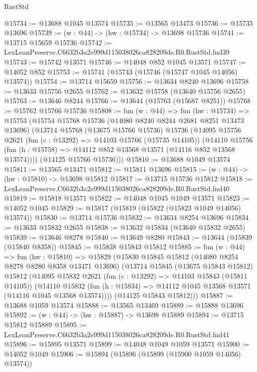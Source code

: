 \begin{lexlean}{RustStd}
\begin{coremodule}
@15734 := @13688 @1045 @13574
@15735 := @13565 @13473
@15736 := @15735 @13696
@15739 := (w : @44) -> (hw : @15734) -> @13698 @15736
@15741 := @13715 @15659 @15736
@15742 := LexLeanPreserve.C6632b3a2e999d115038026ca828209de.R0.RustStd.fnd39
@15743 := @15742 @13571
@15746 := @14048 @852 @1045 @13571
@15747 := @14052 @852
@15753 := @15741 (@15743 (@15746 (@15747 @1045 @14056) @13574))
@15754 := @13714 @15659
@15756 := @13634 @8240 @13696
@15758 := @13633 @15756 @2655
@15762 := @13632 @15758 (@13640 @15756 @2655)
@15763 := @13646 @8244
@15766 := @13644 (@15763 (@15687 @8251))
@15768 := @15762 @15766 @15736
@15808 := fun (w : @44) =>
  fun (hw : @15734) =>
  @15753
    (@15754
      @15768
      @15736
      (@14080 @8240 @8244 @2681 @8251 @13473 @13696)
      (@13714
        @15768
        (@13675 @15766 @15736)
        @15736
        (@14095
          @15756
          @2621
          (fun (c : @13292) => @14103 @15766 (@15735 @14105))
          (@14110
            @15756
            (fun (h : @15758) => @14112 @852 @13568 @13571 (@14116 @852 @13568 @13574))))
        (@14125 @15766 @15736)))
@15810 := @13688 @1049 @13574
@15811 := @13565 @13471
@15812 := @15811 @13696
@15815 := (w : @44) -> (hw : @15810) -> @13698 @15812
@15817 := @13715 @15736 @15812
@15818 := LexLeanPreserve.C6632b3a2e999d115038026ca828209de.R0.RustStd.fnd40
@15819 := @15818 @13571
@15822 := @14048 @1045 @1049 @13571
@15823 := @14052 @1045
@15829 := @15817 (@15819 (@15822 (@15823 @1049 @14056) @13574))
@15830 := @13714 @15736
@15832 := @13634 @8254 @13696
@15834 := @13633 @15832 @2655
@15838 := @13632 @15834 (@13640 @15832 @2655)
@15839 := @13646 @8278
@15840 := @13649 @8280
@15843 := @13644 (@15839 (@15840 @8358))
@15845 := @15838 @15843 @15812
@15885 := fun (w : @44) =>
  fun (hw : @15810) =>
  @15829
    (@15830
      @15845
      @15812
      (@14080 @8254 @8278 @8280 @8358 @13471 @13696)
      (@13714
        @15845
        (@13675 @15843 @15812)
        @15812
        (@14095
          @15832
          @2621
          (fun (c : @13292) => @14103 @15843 (@15811 @14105))
          (@14110
            @15832
            (fun (h : @15834) => @14112 @1045 @13568 @13571 (@14116 @1045 @13568 @13574))))
        (@14125 @15843 @15812)))
@15887 := @13688 @1059 @13574
@15888 := @13565 @13469
@15889 := @15888 @13696
@15892 := (w : @44) -> (hw : @15887) -> @13698 @15889
@15894 := @13715 @15812 @15889
@15895 := LexLeanPreserve.C6632b3a2e999d115038026ca828209de.R0.RustStd.fnd41
@15896 := @15895 @13571
@15899 := @14048 @1049 @1059 @13571
@15900 := @14052 @1049
@15906 := @15894 (@15896 (@15899 (@15900 @1059 @14056) @13574))

\end{coremodule}
\end{lexlean}
